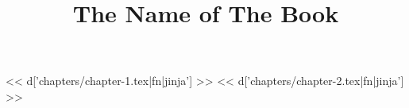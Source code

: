 \documentclass[11pt,a4paper]{book}
\title{The Name of The Book}
\begin{document}
\frontmatter

\maketitle

\tableofcontents

\mainmatter

<< d['chapters/chapter-1.tex|fn|jinja'] >>
<< d['chapters/chapter-2.tex|fn|jinja'] >>
\end{document}
